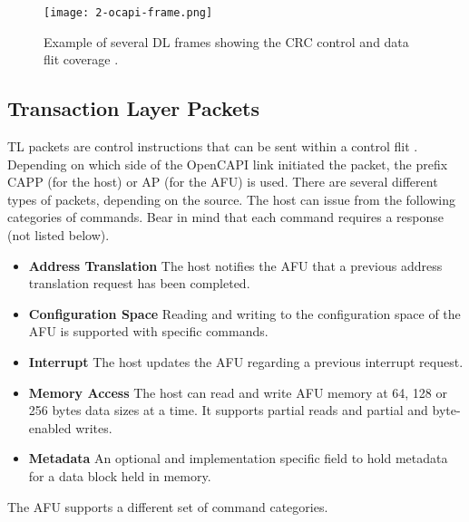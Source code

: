 
\begin{figure}[h]
  \centering
  \texttt{[image: 2-ocapi-frame.png]}
  \caption{Example of several DL frames showing the CRC control and data flit coverage \cite{ocapi-tl}.}
  \label{fig:2-ocapi-frame}
\end{figure}



\subsection{Transaction Layer Packets}
\label{sec:packets}
TL packets are control instructions that can be sent within a control flit \cite{ocapi-tl}. Depending on which side of the OpenCAPI link initiated the packet, the prefix CAPP (for the host) or AP (for the AFU) is used. There are several different types of packets, depending on the source. The host can issue from the following categories of commands. Bear in mind that each command requires a response (not listed below).
\begin{itemize}
  \item{\textbf{Address Translation} The host notifies the AFU that a previous address translation request has been completed.}
  \item{\textbf{Configuration Space} Reading and writing to the configuration space of the AFU is supported with specific commands.}
  \item{\textbf{Interrupt} The host updates the AFU regarding a previous interrupt request.}
  \item{\textbf{Memory Access} The host can read and write AFU memory at 64, 128 or 256 bytes data sizes at a time. It supports partial reads and partial and byte-enabled writes.}
  \item{\textbf{Metadata} An optional and implementation specific field to hold metadata for a data block held in memory.}
\end{itemize}
The AFU supports a different set of command categories.
